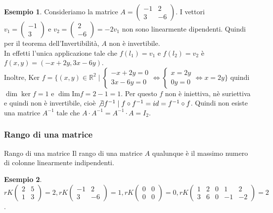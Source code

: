 \documentclass[a4paper]{article}
\theoremstyle{definition}
\newtheorem*{es}{Esempio}
\begin{document}
\begin{es}
	Consideriamo la matrice $A = \begin{pmatrix}
			-1 & 2  \\
			3  & -6
		\end{pmatrix}$. I vettori $v_1 = \begin{pmatrix}
			-1 \\
			3
		\end{pmatrix} \text{ e } v_2 = \begin{pmatrix}
			2 \\
			-6
		\end{pmatrix} = -2v_1$ non sono linearmente dipendenti. Quindi per il teorema dell'Invertibilità, $A$ non è invertibile. \\
	In effetti l'unica applicazione tale che $f(l_1) = v_1$ e $f(l_2) = v_2$ è $f(x, y) = (-x + 2y, 3x - 6y)$. \\
	Inoltre, Ker $f = \{(x, y) \in \mathbb{R}^2 \mid \begin{cases}
			-x + 2y = 0 \\
			3x - 6y = 0
		\end{cases} \Leftrightarrow \begin{cases}
			x = 2y \\
			0y = 0
		\end{cases} \Leftrightarrow x = 2y\}$ quindi $\dim \ker f = 1$ e $\dim \text{Im} f = 2 - 1 = 1$.
	Per questo $f$ non è iniettiva, nè suriettiva e quindi non è invertibile, cioè $\not\exists f^{-1} \mid f \circ f^{-1} = id = f^{-1} \circ f$.
	Quindi non esiste una matrice $A^{-1}$ tale che $A \cdot A^{-1} = A^{-1} \cdot A = I_2$.
\end{es}

\subsubsection{Rango di una matrice}
\begin{deff}{Rango di una matrice}{}
	Il rango di una matrice $A$ qualunque è il massimo numero di colonne linearmente indipendenti.
\end{deff}

\begin{es}
	$rK\begin{pmatrix}
			2 & 5 \\
			1 & 3
		\end{pmatrix} = 2, rK\begin{pmatrix}
			-1 & 2  \\
			3  & -6
		\end{pmatrix} = 1, rK\begin{pmatrix}
			0 & 0 \\
			0 & 0
		\end{pmatrix} = 0, rK\begin{pmatrix}
			1 & 2 & 0 & 1  & 2  \\
			3 & 6 & 0 & -1 & -2
		\end{pmatrix} = 2$.
\end{es}
\end{document}
